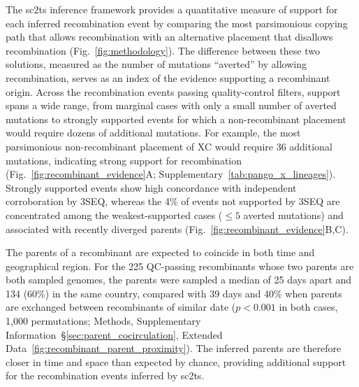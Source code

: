 \documentclass[12pt]{article}
\newcommand{\supref}[1]{Supplementary Information~\S\ref{#1}}
\newcommand{\figref}[1]{Fig.~\ref{#1}}
\newcommand{\edref}[1]{Extended Data~\ref{#1}}
\newcommand{\siref}[1]{Supplementary~\ref{#1}}
\begin{document}
The sc2ts inference framework provides a quantitative measure of support for
each inferred recombination event by comparing the most parsimonious copying
path that allows recombination with an alternative placement that disallows
recombination (\figref{fig:methodology}).
The difference between these two solutions, measured as the
number of mutations ``averted'' by allowing recombination, serves as an index of
the evidence supporting a recombinant origin.
Across the recombination events
passing quality-control filters, support spans a wide range, from marginal
cases with only a small number of averted mutations to strongly supported
events for which a non-recombinant placement would require dozens of additional
mutations. For example, the most parsimonious non-recombinant placement of XC
would require 36 additional mutations, indicating strong support for
recombination (\figref{fig:recombinant_evidence}A;
\siref{tab:pango_x_lineages}).
Strongly supported events show high concordance with independent corroboration by
3SEQ, whereas the 4\% of events not supported by 3SEQ are
concentrated among the weakest-supported cases ($\leq 5$ averted mutations)
and associated with recently diverged parents
(\figref{fig:recombinant_evidence}B,C).

The parents of a recombinant are expected to coincide in both time and geographical region.
For the 225 QC-passing recombinants whose two parents are both sampled genomes,
the parents were sampled a median of 25 days apart
and 134 (60\%) in the same country,
compared with 39 days and 40\% when parents are exchanged
between recombinants of similar date
($p < 0.001$ in both cases, 1,000 permutations;
Methods, \supref{sec:parent_cocirculation},
\edref{fig:recombinant_parent_proximity}).
The inferred parents are therefore closer in time and space
than expected by chance, providing additional support
for the recombination events inferred by sc2ts.
\end{document}
